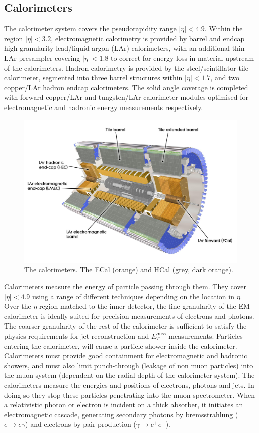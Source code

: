 \subsection{Calorimeters}

The calorimeter system covers the pseudorapidity range \(|\eta| < 4.9\).
Within the region \(|\eta|< 3.2\), electromagnetic calorimetry is provided by barrel and 
endcap high-granularity lead/liquid-argon (LAr) calorimeters,
with an additional thin LAr presampler covering \(|\eta| < 1.8\)
to correct for energy loss in material upstream of the calorimeters.
Hadron calorimetry is provided by the steel/scintillator-tile calorimeter,
segmented into three barrel structures within \(|\eta| < 1.7\), and two copper/LAr hadron endcap calorimeters.
The solid angle coverage is completed with forward copper/LAr and tungsten/LAr calorimeter modules
optimised for electromagnetic and hadronic energy measurements respectively.

%
\begin{figure}[!htpb]
  \centering
  \includegraphics[width=0.5\linewidth]{chapters/2.detector/figs/atlas_calos.jpg}
  \caption{The \ATLAS calorimeters. The ECal (orange) and HCal (grey, dark orange).}
  \label{fig:atlas_calos}
\end{figure}
%





Calorimeters measure the energy of particle passing through them. They cover $|\eta| < 4.9$ using a range of different techniques depending on the location in $\eta$. Over the $\eta$ region matched to the inner detector, the fine granularity of the EM calorimeter is ideally suited for precision measurements of electrons and photons. The coarser granularity of the rest of the calorimeter is sufficient to satisfy the physics requirements for jet reconstruction and $E_T^{\textrm{miss}}$ measurements. Particles entering the calorimeter, will cause a particle shower inside the calorimeter. Calorimeters must provide good containment for electromagnetic and hadronic showers, and must also limit punch-through (leakage of non muon particles) into the muon system (dependent on the radial depth of the calorimeter system). The calorimeters measure the energies and positions of electrons, photons and jets. In doing so they stop these particles penetrating into the muon spectrometer. When a relativistic photon or electron is incident on a thick absorber, it initiates an electromagnetic cascade, generating secondary photons by bremsstrahlung ($e \rightarrow e\gamma$) and electrons by pair production ($\gamma \rightarrow e^+ e^- $).
    
